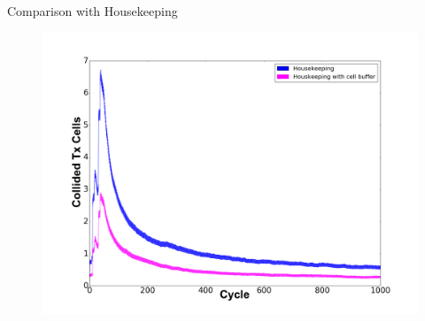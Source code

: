 \begin{withoutheadline}
\begin{frame}{Comparison with Housekeeping }

\begin{figure}[p]

\includegraphics[width=\linewidth]{figures/graph2.png}
\end{figure}



\end{frame}
\end{withoutheadline}



